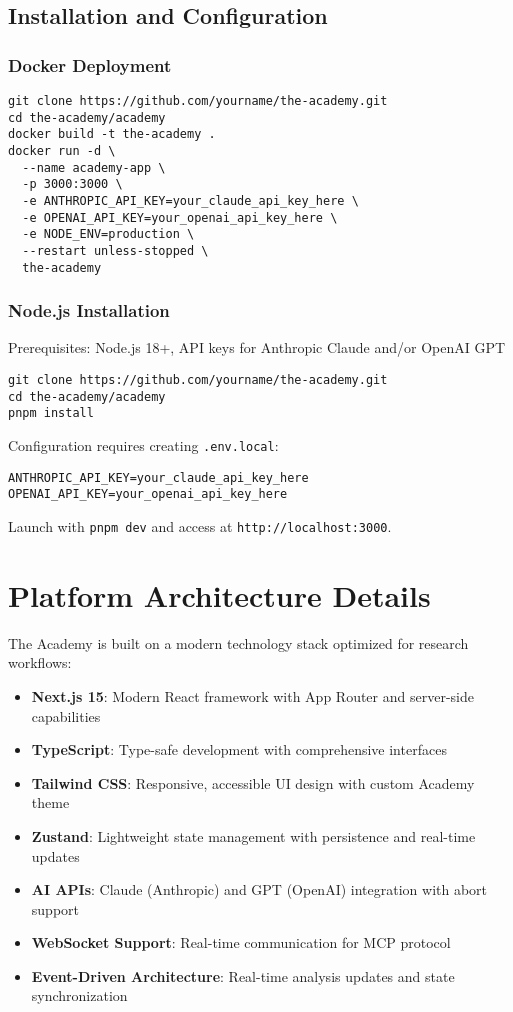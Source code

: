 \documentclass[11pt,letterpaper]{article}
\newcommand{\theacademy}{The Academy}
\begin{document}
\subsection{Installation and Configuration}

\subsubsection{Docker Deployment}
\begin{verbatim}
git clone https://github.com/yourname/the-academy.git
cd the-academy/academy
docker build -t the-academy .
docker run -d \
  --name academy-app \
  -p 3000:3000 \
  -e ANTHROPIC_API_KEY=your_claude_api_key_here \
  -e OPENAI_API_KEY=your_openai_api_key_here \
  -e NODE_ENV=production \
  --restart unless-stopped \
  the-academy
\end{verbatim}

\subsubsection{Node.js Installation}
Prerequisites: Node.js 18+, API keys for Anthropic Claude and/or OpenAI GPT

\begin{verbatim}
git clone https://github.com/yourname/the-academy.git
cd the-academy/academy
pnpm install
\end{verbatim}

Configuration requires creating \texttt{.env.local}:
\begin{verbatim}
ANTHROPIC_API_KEY=your_claude_api_key_here
OPENAI_API_KEY=your_openai_api_key_here
\end{verbatim}

Launch with \texttt{pnpm dev} and access at \texttt{http://localhost:3000}.

\section{Platform Architecture Details}
\label{app:architecture}

\theacademy{} is built on a modern technology stack optimized for research workflows:

\begin{itemize}
    \item \textbf{Next.js 15}: Modern React framework with App Router and server-side capabilities
    \item \textbf{TypeScript}: Type-safe development with comprehensive interfaces
    \item \textbf{Tailwind CSS}: Responsive, accessible UI design with custom Academy theme
    \item \textbf{Zustand}: Lightweight state management with persistence and real-time updates
    \item \textbf{AI APIs}: Claude (Anthropic) and GPT (OpenAI) integration with abort support
    \item \textbf{WebSocket Support}: Real-time communication for MCP protocol
    \item \textbf{Event-Driven Architecture}: Real-time analysis updates and state synchronization
\end{itemize}
\end{document}
